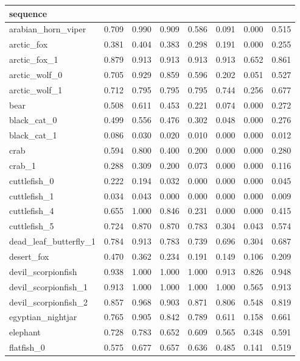 \begin{table*}[]
\begin{tabular}{l|c|cccccc}
sequence &  &  &  &  &  &  &  \\ \hline
arabian\_horn\_viper & 0.709 & 0.990 & 0.909 & 0.586 & 0.091 & 0.000 & 0.515 \\
arctic\_fox & 0.381 & 0.404 & 0.383 & 0.298 & 0.191 & 0.000 & 0.255 \\
arctic\_fox\_1 & 0.879 & 0.913 & 0.913 & 0.913 & 0.913 & 0.652 & 0.861 \\
arctic\_wolf\_0 & 0.705 & 0.929 & 0.859 & 0.596 & 0.202 & 0.051 & 0.527 \\ 
arctic\_wolf\_1 & 0.712 & 0.795 & 0.795 & 0.795 & 0.744 & 0.256 & 0.677 \\
bear & 0.508 & 0.611 & 0.453 & 0.221 & 0.074 & 0.000 & 0.272 \\
black\_cat\_0 & 0.499 & 0.556 & 0.476 & 0.302 & 0.048 & 0.000 & 0.276 \\
black\_cat\_1 & 0.086 & 0.030 & 0.020 & 0.010 & 0.000 & 0.000 & 0.012 \\
crab & 0.594 & 0.800 & 0.400 & 0.200 & 0.000 & 0.000 & 0.280 \\
crab\_1 & 0.288 & 0.309 & 0.200 & 0.073 & 0.000 & 0.000 & 0.116 \\
cuttlefish\_0 & 0.222 & 0.194 & 0.032 & 0.000 & 0.000 & 0.000 & 0.045 \\
cuttlefish\_1 & 0.034 & 0.043 & 0.000 & 0.000 & 0.000 & 0.000 & 0.009 \\
cuttlefish\_4 & 0.655 & 1.000 & 0.846 & 0.231 & 0.000 & 0.000 & 0.415 \\
cuttlefish\_5 & 0.724 & 0.870 & 0.870 & 0.783 & 0.304 & 0.043 & 0.574 \\
dead\_leaf\_butterfly\_1 & 0.784 & 0.913 & 0.783 & 0.739 & 0.696 & 0.304 & 0.687 \\
desert\_fox & 0.470 & 0.362 & 0.234 & 0.191 & 0.149 & 0.106 & 0.209 \\
devil\_scorpionfish & 0.938 & 1.000 & 1.000 & 1.000 & 0.913 & 0.826 & 0.948 \\
devil\_scorpionfish\_1 & 0.913 & 1.000 & 1.000 & 1.000 & 1.000 & 0.565 & 0.913 \\
devil\_scorpionfish\_2 & 0.857 & 0.968 & 0.903 & 0.871 & 0.806 & 0.548 & 0.819 \\
egyptian\_nightjar & 0.765 & 0.905 & 0.842 & 0.789 & 0.611 & 0.158 & 0.661 \\
elephant & 0.728 & 0.783 & 0.652 & 0.609 & 0.565 & 0.348 & 0.591 \\
flatfish\_0 & 0.575 & 0.677 & 0.657 & 0.636 & 0.485 & 0.141 & 0.519 \\

\end{tabular}
\end{table*}
